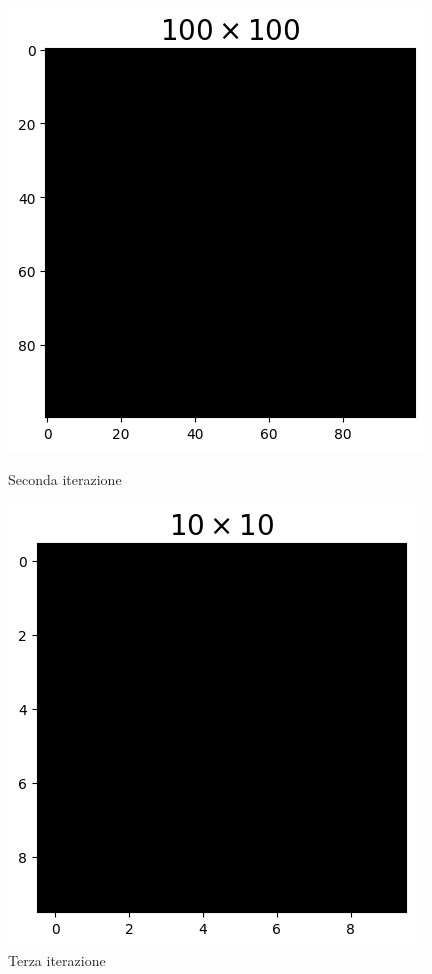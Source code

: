 \begin{figure}[htbp]
    \begin{minipage}{0.45\textwidth}  
      \centering
      \includegraphics[page=1, width=\textwidth]{Immagini/simIsing2D/cg/cg_100_2.0.png}
      \caption{Seconda iterazione}
    \end{minipage}\hfill
    \begin{minipage}{0.45\textwidth}  
      \centering
      \includegraphics[page=1, width=\textwidth]{Immagini/simIsing2D/cg/cg_10_2.0.png}
      \caption{Terza iterazione}
    \end{minipage}


\end{figure}
